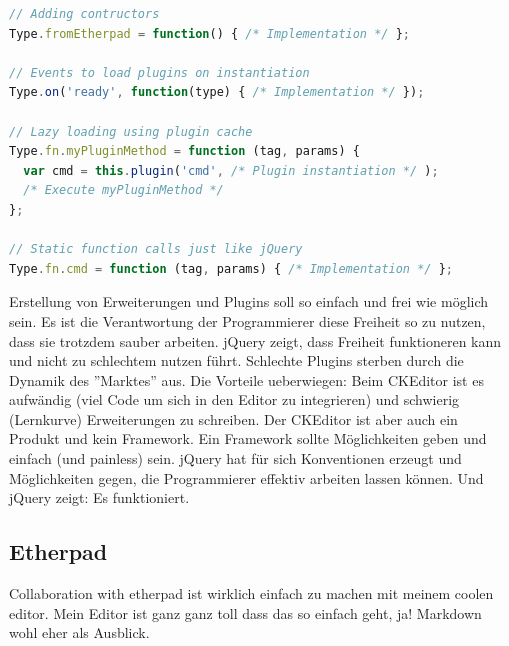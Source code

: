 \begin{lstlisting}[language=JavaScript, caption=Example calls to format text, label=lst:format-examples]
// Adding contructors
Type.fromEtherpad = function() { /* Implementation */ };

// Events to load plugins on instantiation
Type.on('ready', function(type) { /* Implementation */ });

// Lazy loading using plugin cache
Type.fn.myPluginMethod = function (tag, params) {
  var cmd = this.plugin('cmd', /* Plugin instantiation */ );
  /* Execute myPluginMethod */
};

// Static function calls just like jQuery
Type.fn.cmd = function (tag, params) { /* Implementation */ };
\end{lstlisting}

Erstellung von Erweiterungen und Plugins soll so einfach und frei wie möglich sein. Es ist die Verantwortung der Programmierer diese Freiheit so zu nutzen, dass sie trotzdem sauber arbeiten. jQuery zeigt, dass Freiheit funktioneren kann und nicht zu schlechtem nutzen führt. Schlechte Plugins sterben durch die Dynamik des ''Marktes'' aus. Die Vorteile ueberwiegen: Beim CKEditor ist es aufwändig (viel Code um sich in den Editor zu integrieren) und schwierig (Lernkurve) Erweiterungen zu schreiben. Der CKEditor ist aber auch ein Produkt und kein Framework. Ein Framework sollte Möglichkeiten geben und einfach (und painless) sein. jQuery hat für sich Konventionen erzeugt und Möglichkeiten gegen, die Programmierer effektiv arbeiten lassen können. Und jQuery zeigt: Es funktioniert.

\subsection{Etherpad} Collaboration with etherpad ist wirklich einfach zu machen mit meinem coolen editor. Mein Editor ist ganz ganz toll dass das so einfach geht, ja!
Markdown wohl eher als Ausblick.
